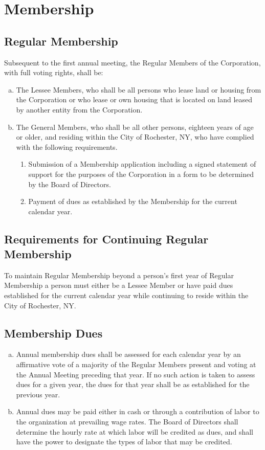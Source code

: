 \section{Membership}
\label{sec:membership}

\subsection{Regular Membership}
Subsequent to the first annual meeting, the Regular Members of the
Corporation, with full voting rights, shall be:
\begin{enumerate}[a.]
\item The Lessee Members, who shall be all persons who lease land or
  housing from the Corporation or who lease or own housing that is
  located on land leased by another entity from the Corporation.
\item The General Members, who shall be all other persons, eighteen
  years of age or older, and residing within the City of Rochester,
  NY, who have complied with the following requirements.
  \begin{enumerate}[(1)]
  \item Submission of a Membership application including a signed
    statement of support for the purposes of the Corporation in a form
    to be determined by the Board of Directors.
  \item Payment of dues as established by the Membership for the
    current calendar year.
  \end{enumerate}
\end{enumerate}

\subsection{Requirements for Continuing Regular Membership}
To maintain Regular Membership beyond a person’s first year of Regular
Membership a person must either be a Lessee Member or have paid dues
established for the current calendar year while continuing to reside
within the City of Rochester, NY.

\subsection{Membership Dues}
\begin{enumerate}[a.]
\item Annual membership dues shall be assessed for each calendar year
  by an affirmative vote of a majority of the Regular Members present
  and voting at the Annual Meeting preceding that year. If no such
  action is taken to assess dues for a given year, the dues for that
  year shall be as established for the previous year.
\item Annual dues may be paid either in cash or through a contribution
  of labor to the organization at prevailing wage rates. The Board of
  Directors shall determine the hourly rate at which labor will be
  credited as dues, and shall have the power to designate the types of
  labor that may be credited.
\end{enumerate}
  
